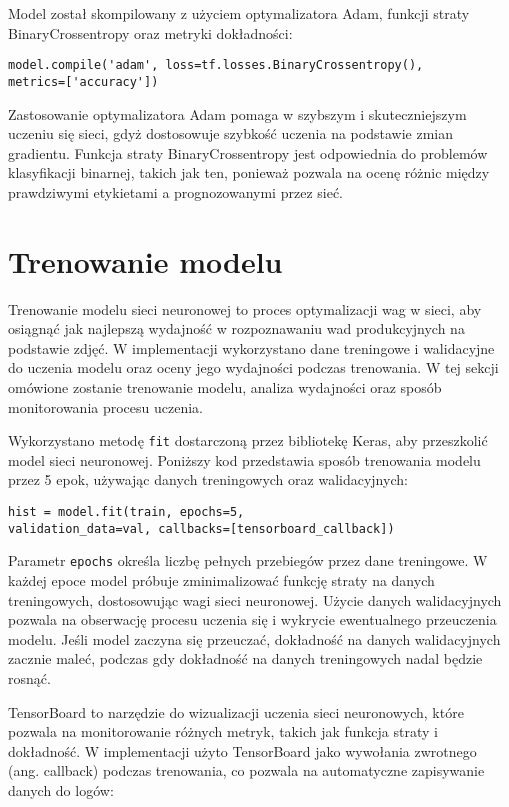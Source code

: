 Model został skompilowany z użyciem optymalizatora Adam, funkcji straty BinaryCrossentropy oraz metryki dokładności:

\begin{verbatim}
model.compile('adam', loss=tf.losses.BinaryCrossentropy(),
metrics=['accuracy'])
\end{verbatim}

Zastosowanie optymalizatora Adam pomaga w szybszym i skuteczniejszym uczeniu się sieci, gdyż dostosowuje szybkość uczenia na podstawie zmian gradientu. Funkcja straty BinaryCrossentropy jest odpowiednia do problemów klasyfikacji binarnej, takich jak ten, ponieważ pozwala na ocenę różnic między prawdziwymi etykietami a prognozowanymi przez sieć.

\section{Trenowanie modelu}

Trenowanie modelu sieci neuronowej to proces optymalizacji wag w sieci, aby osiągnąć jak najlepszą wydajność w rozpoznawaniu wad produkcyjnych na podstawie zdjęć. W implementacji wykorzystano dane treningowe i walidacyjne do uczenia modelu oraz oceny jego wydajności podczas trenowania. W tej sekcji omówione zostanie trenowanie modelu, analiza wydajności oraz sposób monitorowania procesu uczenia.

Wykorzystano metodę \verb|fit| dostarczoną przez bibliotekę Keras, aby przeszkolić model sieci neuronowej. Poniższy kod przedstawia sposób trenowania modelu przez 5 epok, używając danych treningowych oraz walidacyjnych:

\begin{verbatim}
hist = model.fit(train, epochs=5, 
validation_data=val, callbacks=[tensorboard_callback])
\end{verbatim}

Parametr \verb|epochs| określa liczbę pełnych przebiegów przez dane treningowe. W każdej epoce model próbuje zminimalizować funkcję straty na danych treningowych, dostosowując wagi sieci neuronowej. Użycie danych walidacyjnych pozwala na obserwację procesu uczenia się i wykrycie ewentualnego przeuczenia modelu. Jeśli model zaczyna się przeuczać, dokładność na danych walidacyjnych zacznie maleć, podczas gdy dokładność na danych treningowych nadal będzie rosnąć.

TensorBoard to narzędzie do wizualizacji uczenia sieci neuronowych, które pozwala na monitorowanie różnych metryk, takich jak funkcja straty i dokładność. W implementacji użyto TensorBoard jako wywołania zwrotnego (ang. callback) podczas trenowania, co pozwala na automatyczne zapisywanie danych do logów:

